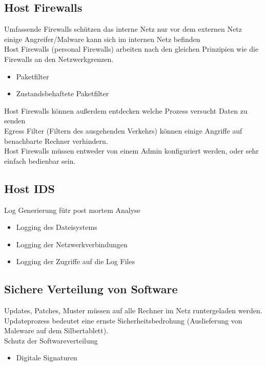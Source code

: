 \documentclass{article} %
\begin{document}
\subsection{Host Firewalls}
 Umfassende Firewalls schützen das interne Netz nur vor dem externen Netz\\
einige Angreifer/Malware kann sich im internen Netz befinden\\
Host Firewalls (personal Firewalls) arbeiten nach den gleichen Prinzipien wie die Firewalls an den Netzwerkgrenzen.\\
\begin{itemize}
	\item Paketfilter
    \item Zustandsbehaftete Paketfilter
\end{itemize}
Host Firewalls können außerdem entdecken welche Prozess versucht Daten zu senden\\
Egress Filter (Filtern des ausgehenden Verkehrs) können einige Angriffe auf benachbarte Rechner verhindern.\\
Host Firewalls müssen entweder von einem Admin konfiguriert werden, oder sehr einfach bedienbar sein.
\subsection{Host IDS}
Log Generierung fütr post mortem Analyse
\begin{itemize}
	\item Logging des Dateisystems
    \item Logging der Netzwerkverbindungen
    \item Logging der Zugriffe auf die Log Files
\end{itemize}
\subsection{Sichere Verteilung von Software}
Updates, Patches, Muster müssen auf alle Rechner im Netz runtergeladen werden.\\
Updateprozess bedeutet eine ernste Sicherheitsbedrohung (Auslieferung von Maleware auf dem Silbertablett).\\
Schutz der Softwareverteilung
\begin{itemize}
	\item Digitale Signaturen
\end{itemize}
\end{document}

